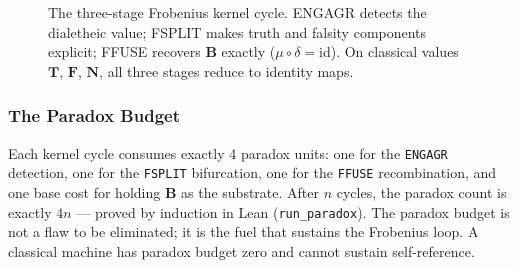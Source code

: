\documentclass[10pt,a4paper]{article}
\begin{document}
\begin{figure}[htbp]
\centering
{}
\caption{The three-stage Frobenius kernel cycle. ENGAGR detects the dialetheic
value; FSPLIT makes truth and falsity components explicit; FFUSE recovers
$\mathbf{B}$ exactly ($\mu\circ\delta=\mathrm{id}$). On classical values
$\mathbf{T}$, $\mathbf{F}$, $\mathbf{N}$, all three stages reduce to identity maps.}
\label{fig:kernel-cycle}
\end{figure}


\subsubsection{The Paradox Budget}

Each kernel cycle consumes exactly 4 paradox units: one for the \texttt{ENGAGR} detection, one for the \texttt{FSPLIT}  bifurcation, one for the \texttt{FFUSE} recombination, and one base cost for holding $\mathbf{B}$ as the substrate. After $n$ cycles, the paradox count is exactly $4n$ --- proved by induction in Lean (\texttt{run\_\allowbreak paradox}). The paradox budget is not a flaw to be eliminated; it is the fuel that sustains the Frobenius loop. A classical machine has paradox budget zero and cannot sustain self-reference.
\end{document}

